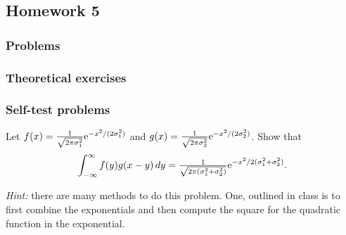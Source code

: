 \subsection{Homework 5}
\subsubsection{Problems}
\begin{problem}[Ross, \S 5, \# 16]

\end{problem}
\begin{solution*}
\end{solution*}

\begin{problem}[Ross, \S 5, \# 20]
\end{problem}
\begin{solution*}
\end{solution*}

\begin{problem}[Ross, \S 5, \# 23]
\end{problem}
\begin{solution*}
\end{solution*}

\begin{problem}[Ross, \S 5, \# 30]
\end{problem}
\begin{solution*}
\end{solution*}

\subsubsection{Theoretical exercises}
\begin{problem}[Ross, \S 5, \# 11]
\end{problem}
\begin{solution*}
\end{solution*}

\begin{problem}[Ross, \S 5, \# 31]
\end{problem}
\begin{solution*}
\end{solution*}

\subsubsection{Self-test problems}
\begin{problem}
  Let \(f(x)=\frac{1}{\sqrt{2\pi\sigma_1^2}}\mathrm{e}^{-x^2/(2\sigma_1^2)}\) and
  \(g(x)=\frac{1}{\sqrt{2\pi \sigma_2^2}}\mathrm{e}^{-x^2/(2\sigma_2^2)}\). Show
  that
  \[
    \int_{-\infty}^\infty f(y)g(x-y)\mathop{}\!d y=
    \tfrac{1}{\sqrt{2\pi(\sigma_1^2+\sigma_2^2)}}\mathrm{e}^{-x^2/2(\sigma_1^2+\sigma_2^2)}.
  \]

  \noindent\emph{Hint:} there are many methods to do this problem. One,
  outlined in class is to first combine the exponentials and then compute
  the square for the quadratic function in the exponential.
\end{problem}
\begin{solution*}
\end{solution*}


